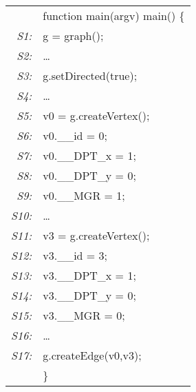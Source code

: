 \documentclass[letterpaper]{sig-alternate} \special{papersize=8.5in,11in}
\begin{document}
\begin{figure}
\begin{center}
      {\small \tt
        \begin{tabular}[b]{rl}
          &function main(argv) main() \{ \\
	  {\em \scriptsize S1:}& \quad g = graph(); \\
	  {\em \scriptsize S2:}& \quad \ldots        \\
          {\em \scriptsize S3:}& \quad g.setDirected(true); \\
          {\em \scriptsize S4:}& \quad \ldots \\ 
          {\em \scriptsize S5:}& \quad v0  = g.createVertex(); \\
          {\em \scriptsize S6:}& \quad v0.\_\_id     = 0; \\
          {\em \scriptsize S7:}& \quad v0.\_\_DPT\_x  = 1; \\
          {\em \scriptsize S8:}& \quad v0.\_\_DPT\_y  = 0; \\
          {\em \scriptsize S9:}& \quad v0.\_\_MGR    = 1; \\
          {\em \scriptsize S10:}& \quad \ldots \\ 
          {\em \scriptsize S11:}& \quad v3  = g.createVertex(); \\
          {\em \scriptsize S12:}& \quad v3.\_\_id     = 3; \\
          {\em \scriptsize S13:}& \quad v3.\_\_DPT\_x  = 1; \\
          {\em \scriptsize S14:}& \quad v3.\_\_DPT\_y  = 0; \\
          {\em \scriptsize S15:}& \quad v3.\_\_MGR    = 0; \\
          {\em \scriptsize S16:}& \quad \ldots \\ 
          {\em \scriptsize S17:}& \quad g.createEdge(v0,v3); \\
	  &\}
        \end{tabular}
      }
\end{center}
\end{figure}
\end{document}
